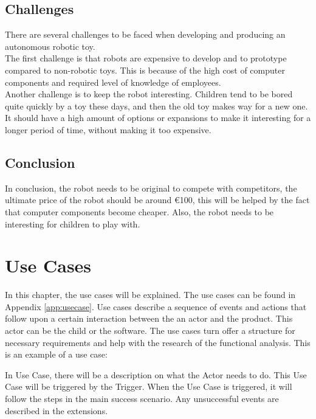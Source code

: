 \documentclass[11pt,twoside,a4paper]{report}
\begin{document}
\section{Challenges}
There are several challenges to be faced when developing and producing an autonomous robotic toy. \\
The first challenge is that robots are expensive to develop and to prototype compared to non-robotic toys. This is because of the high cost of computer components and required level of knowledge of employees.\\
Another challenge is to keep the robot interesting. Children tend to be bored quite quickly by a toy these days, and then the old toy makes way for a new one. It should have a high amount of options or expansions to make it interesting for a longer period of time, without making it too expensive. \\

\section{Conclusion}
In conclusion, the robot needs to be original to compete with competitors, the ultimate price of the robot should be around €100, this will be helped by the fact that computer components become cheaper. Also, the robot needs to be interesting for children to play with.     

\chapter{Use Cases}
In this chapter, the use cases will be explained. The use cases can be found in Appendix \ref{app:usecase}. 
Use cases describe a sequence of events and actions that follow upon a certain interaction between the an actor and the product. This actor can be the child or the software. The use cases turn offer a structure for necessary requirements and help with the research of the functional analysis.
This is an example of a use case:

\begin{usecase}
\end{usecase}
In Use Case, there will be a description on what the Actor needs to do. This Use Case will be triggered by the Trigger. When the Use Case is triggered, it will follow the steps in the main success scenario. Any unsuccessful events are described in the extensions. 
\end{document}
